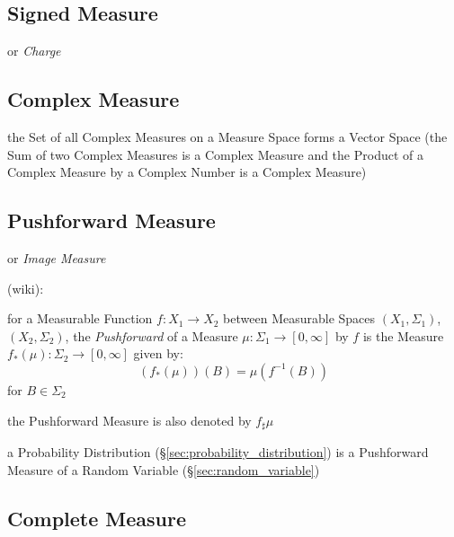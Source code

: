 \subsection{Signed Measure}\label{sec:signed_measure}

or \emph{Charge}



\subsection{Complex Measure}\label{sec:complex_measure}

the Set of all Complex Measures on a Measure Space forms a Vector Space (the Sum
of two Complex Measures is a Complex Measure and the Product of a Complex
Measure by a Complex Number is a Complex Measure)



\subsection{Pushforward Measure}\label{sec:pushforward_measure}

or \emph{Image Measure}

(wiki):

for a Measurable Function $f : X_1 \rightarrow X_2$ between Measurable Spaces
$(X_1, \Sigma_1)$, $(X_2, \Sigma_2)$, the \emph{Pushforward} of a Measure
$\mu : \Sigma_1 \rightarrow [0, \infty]$ by $f$ is the Measure
$f_*(\mu) : \Sigma_2 \rightarrow [0, \infty]$ given by:
\[
  (f_*(\mu))(B) = \mu(f^{-1}(B))
\]
for $B \in \Sigma_2$

the Pushforward Measure is also denoted by $f_\sharp\mu$

\fist a Probability Distribution (\S\ref{sec:probability_distribution}) is a
Pushforward Measure of a Random Variable (\S\ref{sec:random_variable})



\subsection{Complete Measure}\label{sec:complete_measure}

